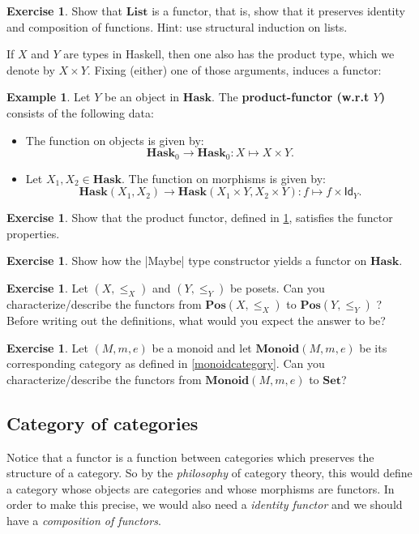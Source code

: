 \documentclass[a4paper,10pt]{scrartcl}
\theoremstyle{plain}
\theoremstyle{definition}
\newtheorem{exa}[thm]{Example}
\newtheorem{exer}[thm]{Exercise}
\newcommand{\cfont}[1]{\ensuremath{\mathsf{#1}}}
\newcommand{\Catb}[1]{\mathbf{#1}}
\newcommand{\List}{\Catb{List}}
\newcommand{\SET}{\Catb{Set}}
\newcommand{\POS}{\Catb{Pos}}
\newcommand{\MON}{\Catb{Monoid}}
\newcommand{\HASK}{\Catb{Hask}}
\newcommand{\Ob}[1]{{#1}_0}
\newcommand{\CHom}[3]{{#1}(#2,#3)}
\newcommand{\Id}[1][]{\cfont{Id}_{#1}}
\begin{document}
\begin{exer}
  Show that $\List$ is a  functor, that is, show that it preserves identity and composition of functions.
  Hint: use structural induction on lists.
\end{exer}

If $X$ and $Y$ are types in Haskell, then one also has the product type, which we denote by $X\times Y$. Fixing (either) one of those arguments, induces a functor:
\begin{exa}\label{example:functor_haskproduct} Let $Y$ be an object in $\HASK$. The \textbf{product-functor (w.r.t $Y$)} consists of the following data:
\begin{itemize}
\item The function on objects is given by:
\[
\Ob{\HASK} \to \Ob{\HASK}: X\mapsto X\times Y.
\]
\item Let $X_1,X_2 \in \HASK$. The function on morphisms is given by:
\[
 \CHom{\HASK}{X_1}{X_2} \to \CHom{\HASK}{X_1 \times Y}{X_2\times Y}: f\mapsto f\times \Id[Y].
\]
\end{itemize}
\end{exa}

\begin{exer} Show that the product functor, defined in \cref{example:functor_haskproduct}, satisfies the functor properties.
\end{exer}

\begin{exer} Show how the |Maybe| type constructor yields a functor on $\HASK$.
\end{exer}




\begin{exer}\label{ex:poset_functors} Let $(X,\leq_X)$ and $(Y,\leq_Y)$ be posets. Can you characterize/describe the functors from $\POS(X,\leq_X)$ to $\POS(Y,\leq_Y)$  ? Before writing out the definitions, what would you expect the answer to be?
\end{exer}

\begin{exer}\label{ex:monoid_functors} Let $(M,m,e)$ be a monoid and let $\MON(M,m,e)$ be its corresponding category as defined in \cref{monoidcategory}. Can you characterize/describe the functors from $\MON(M,m,e)$ to $\SET$?
\end{exer}

\subsection{Category of categories}
Notice that a functor is a function between categories which preserves the structure of a category. So by the \textit{philosophy} of category theory, this would define a category whose objects are categories and whose morphisms are functors. In order to make this precise, we would also need a \textit{identity functor} and we should have a \textit{composition of functors}.
\end{document}
